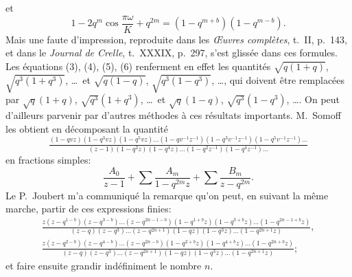 \documentclass[11pt,leqno,oneside,letterpaper]{book}[2005/09/16]
\begin{document}
et
\[
1-2q^m\cos\frac{\pi\omega}{K}+q^{2m} = (1-q^{m+b})(1-q^{m-b}).
\]
Mais une faute d'impression, reproduite dans les \textit{{\OE}uvres compl\`etes}, t.~II,
p.~143, et dans le \textit{Journal de Crelle}, t.~XXXIX, p.~297, s'est gliss\'ee dans ces
formules. Les \'equations (3), (4), (5), (6) renferment en effet les quantit\'es
$\sqrt{q(1+q)}$, $\sqrt{q^3(1+q^3)}$, \ldots\ et
$\sqrt{q(1-q)}$, $\sqrt{q^3(1-q^3)}$, \ldots, qui doivent \^etre
remplac\'ees par
$\sqrt{q}(1+q)$, $\sqrt{q^3}(1+q^3)$, \ldots\ et
$\sqrt{q}(1-q)$, $\sqrt{q^3}(1-q^3)$, \ldots.
On peut d'ailleurs parvenir par d'autres m\'ethodes \`a ces r\'esultats importants.
M.~Somoff les obtient en d\'ecomposant la quantit\'e
\[
\tfrac{ (1-qvz) (1-q^3vz) (1-q^5vz)\ldots
  (1-qv^{-1}z^{-1}) (1-q^3v^{-1}z^{-1}) (1-q^5v^{-1}z^{-1}) \ldots}{
  (z-1) (1-q^2z) (1-q^4z)\ldots (1-q^2z^{-1}) (1-q^4z^{-1})\ldots }
\]
en fractions simples:
\[
      \frac{A_0}{z-1}
+ \sum\frac{A_m}{1-q^{2m}z}
+ \sum\frac{B_m}{z-q^{2m}} .
\]
Le P.~Joubert m'a communiqu\'e la remarque qu'on peut, en suivant la
m\^eme marche, partir de ces expressions finies:
\begin{gather*}
\tfrac{ z(z-q^{1-b} ) (z-q^{3-b} ) \ldots (z-q^{2n-1-b} )
  (1-q^{1+b}z) (1-q^{3+b}z) \ldots (1-q^{2n-1+b}z) }{
  (z-q ) (z-q^3 ) \ldots (z-q^{2n+1} )
  (1-qz) (1-q^3z) \ldots (1-q^{2n+1}z) },
\\[1ex]
\tfrac{ z(z-q^{2-b} ) (z-q^{4-b} ) \ldots (z-q^{2n  -b} )
  (1-q^{2+b}z) (1-q^{4+b}z) \ldots (1-q^{2n  +b}z) }{
  (z-q ) (z-q^3 ) \ldots (z-q^{2n+1} )
  (1-qz) (1-q^3z) \ldots (1-q^{2n+1}z) };
\end{gather*}
et faire ensuite grandir ind\'efiniment le nombre $n$.
\end{document}
